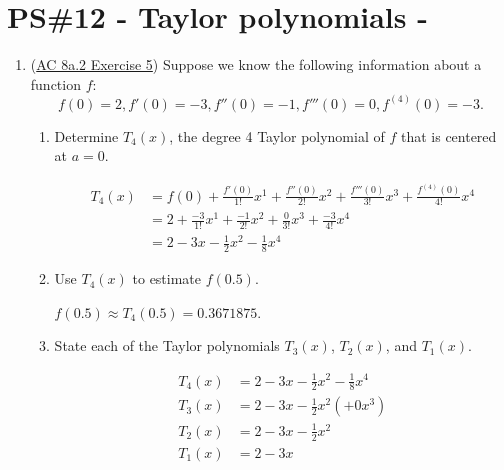 


%


\allowdisplaybreaks
\section{PS\#12 - Taylor polynomials -  }

\everymath{\displaystyle}
\begin{enumerate}[leftmargin=0pt]

\item (\href{https://faculty.gvsu.edu/boelkinm/Home/ACS/sec-8a-2-taylor-poly.html#ez-8a-2-0}{AC 8a.2 Exercise 5}) Suppose we know the following information about a function $f$:
\begin{equation*}
f(0) = 2, f'(0) = -3, f''(0) = -1, f'''(0) = 0, f^{(4)}(0) = -3\text{.}
\end{equation*}
\begin{enumerate}
    \item Determine $T_4(x)$, the degree 4 Taylor polynomial of $f$ that is centered at $a=0$.
    \begin{red}
    \begin{align*}
        T_4(x) &= f(0) + 
        \frac{f'(0)}{1!} x^1 + 
        \frac{f''(0)}{2!} x^2 +
        \frac{f'''(0)}{3!} x^3 +
        \frac{f^{(4)}(0)}{4!} x^4 \\
        &= 2 + 
        \frac{-3}{1!} x^1 + 
        \frac{-1}{2!} x^2 +
        \frac{0}{3!} x^3 +
        \frac{-3}{4!} x^4 \\
        &= 2 - 3x - \frac12 x^2 - \frac18 x^4
    \end{align*}
    \end{red}
    
    \item Use $T_4(x)$ to estimate $f(0.5)$.
    
    \begin{red}
    $f(0.5) \approx T_4(0.5) = 0.3671875.$
    \end{red}
    
    \item State each of the Taylor polynomials $T_3(x)$, $T_2(x)$, and $T_1(x)$.
    \begin{red}
    \begin{align*}
        T_4(x) &= 2 - 3x - \frac12 x^2 - \frac18 x^4 \\
        T_3(x) &= 2 - 3x - \frac12 x^2 (+0x^3) \\
        T_2(x) &= 2 - 3x - \frac12 x^2 \\
        T_1(x) &= 2 - 3x
    \end{align*}
    \end{red}
\end{enumerate}


\end{enumerate}
